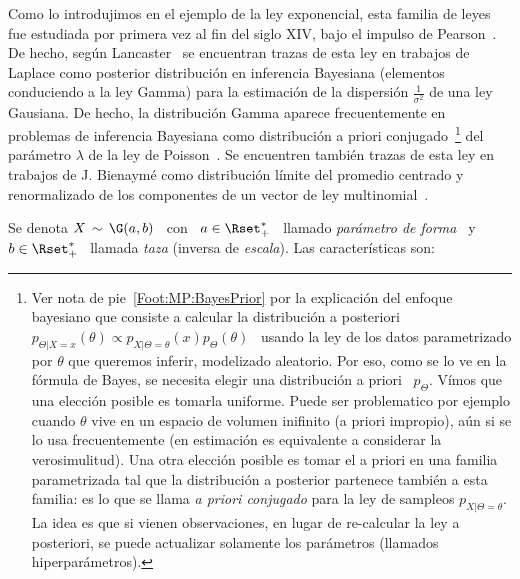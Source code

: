 \label{Sssec:MP:Gamma}

Como lo introdujimos en el ejemplo  de la ley exponencial, esta familia de leyes
fue  estudiada  por primera  vez  al  fin del  siglo  XIV,  bajo  el impulso  de
Pearson~\cite{Pea95}.   De hecho,  seg\'un Lancaster~\cite{Lan66}  se encuentran
trazas  de esta  ley en  trabajos de  Laplace como  posterior  distribuci\'on en
inferencia Bayesiana (elementos conduciendo a la ley Gamma) para la estimaci\'on
de  la  dispersi\'on $\frac1{\sigma^2}$  de  una  ley  Gausiana.  De  hecho,  la
distribuci\'on Gamma aparece frecuentemente en problemas de inferencia Bayesiana
como    distribuci\'on     a    priori    conjugado~\footnote{Ver     nota    de
  pie~\ref{Foot:MP:BayesPrior}  por  la   explicaci\'on  del  enfoque  bayesiano  que
  consiste  a calcular  la distribuci\'on  a  posteriori $p_{\Theta|X=x}(\theta)
  \propto p_{X|\Theta=\theta}(x) p_\Theta(\theta)$ \  usando la ley de los datos
  parametrizado  por $\theta$  que queremos  inferir, modelizado  aleatorio. Por
  eso,  como  se  lo ve  en  la  f\'ormula  de  Bayes,  se necesita  elegir  una
  distribuci\'on a priori  \ $p_\Theta$.  V\'imos que una  elecci\'on posible es
  tomarla uniforme. Puede  ser problematico por ejemplo cuando  $\theta$ vive en
  un  espacio de  volumen inifinito  (a  priori impropio),  a\'un si  se lo  usa
  frecuentemente (en estimaci\'on es equivalente a considerar la verosimulitud).
  Una otra elecci\'on posible es tomar  el a priori en una familia parametrizada
  tal que la  distribuci\'on a posterior partenece tambi\'en  a esta familia: es
  lo que se llama {\em a  priori conjugado} para la ley de sampleos $p_{X|\Theta
    = \theta}$. La idea es que  si vienen observaciones, en lugar de re-calcular
  la ley a posteriori, se  puede actualizar solamente los par\'ametros (llamados
  hiperpar\'ametros).\label{Foot:MP:BayesPriorConjugado}}     del    par\'ametro
$\lambda$ de la  ley de Poisson~\cite{Rob07}. Se encuentren  tambi\'en trazas de
esta ley en trabajos de J.  Bienaym\'e como distribuci\'on l\'imite del promedio
centrado   y  renormalizado   de   los   componentes  de   un   vector  de   ley
multinomial~\cite{Bie38, Lan66}.

Se  denota $X \,  \sim \,  \G(a,b)$ \  con \  $a \in  \Rset_+^*$ \  llamado {\em
par\'ametro de  forma} \ y \  $b \in \Rset_+^*$  \ llamada {\em taza}  (inversa de
{\em escala}). Las caracter\'isticas son:

